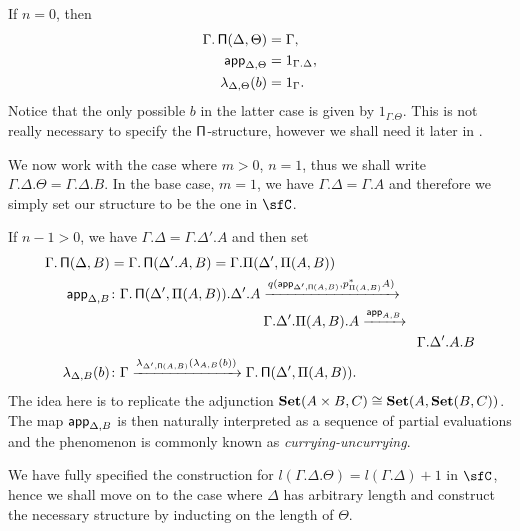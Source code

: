 \begin{construction}[Part 1]
  If $n=0$, then
  \begin{align*}
    \Gamma.\operatorname{\mathsf{\Pi}}(\Delta,\Theta) &=\Gamma, \\
    \operatorname{\mathsf{app}}_{\Delta,\Theta} &=1_{\Gamma.\Delta}, \\
    \lambda_{\Delta,\Theta}(b) &=1_\Gamma.
  \end{align*}
  Notice that the only possible $b$ in the latter case is given by
  $1_{\Gamma.\Theta}$. This is not really necessary to specify the
  $\operatorname{\mathsf{\Pi}}$-structure, however we shall need it later in .

  We now work with the case where $m>0$, $n=1$, thus we shall write
  $\Gamma.\Delta.\Theta=\Gamma.\Delta.B$. In the base case, $m=1$, we have
  $\Gamma.\Delta=\Gamma.A$ and therefore we simply set our structure to be the
  one in $\sfC$.

  If $n-1>0$, we have
  $\Gamma.\Delta=\Gamma.\Delta'.A$ and then set
  \begin{align*}
    \Gamma.\operatorname{\mathsf{\Pi}}(\Delta,B)
    &=\Gamma.\operatorname{\mathsf{\Pi}}(\Delta'.A,B)=\Gamma.\Pi(\Delta',\Pi(A,B)) \\
    \operatorname{\mathsf{app}}_{\Delta,B} 
    &\colon
    \Gamma.\operatorname{\mathsf{\Pi}}(\Delta',\Pi(A,B)).\Delta'.A
                    \xrightarrow{q(\operatorname{\mathsf{app}}_{\Delta',\operatorname{\mathsf{\Pi}}(A,B)},p^*_{\Pi(A,B)}A)} \\
    &\quad\quad\quad\quad\quad\quad\quad\quad\quad\quad\quad
    \Gamma.\Delta'.\Pi(A,B).A
    \xrightarrow{\operatorname{\mathsf{app}}_{A,B}} \\
    &\quad\quad\quad\quad\quad\quad\quad\quad\quad\quad\quad\quad\quad\quad\quad\quad\quad\quad\quad\quad\quad\quad
    \Gamma.\Delta'.A.B \\
    \lambda_{\Delta,B}(b)
    &\colon
    \Gamma
    \xrightarrow{\lambda_{\Delta',\operatorname{\mathsf{\Pi}}(A,B)}(\lambda_{A,B}(b))}
    \Gamma.\operatorname{\mathsf{\Pi}}(\Delta',\Pi(A,B)).
  \end{align*}
  The idea here is to replicate the adjunction $\operatorname{\mathbf{Set}}(A\times
  B,C)\cong\operatorname{\mathbf{Set}}(A,\operatorname{\mathbf{Set}}(B,C))$. The map $\operatorname{\mathsf{app}}_{\Delta,B}$ is then naturally
  interpreted as a sequence of partial evaluations and the phenomenon is
  commonly known as \emph{currying-uncurrying}.

\end{construction}

  We have fully specified the construction for
  $l(\Gamma.\Delta.\Theta)=l(\Gamma.\Delta)+1$ in $\sfC$, hence we shall move on
  to the case where $\Delta$ has arbitrary length and construct the necessary
  structure by inducting on the length of $\Theta$.

